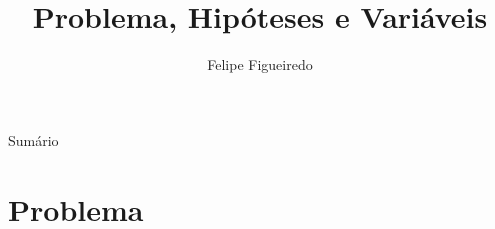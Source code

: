 \documentclass{beamer}
\title%
{Problema, Hipóteses e Variáveis}
\subtitle
{} %
\author%
{Felipe Figueiredo}%
\institute[] %
{
}
\date%
{}
\begin{document}
\begin{frame}
  \titlepage
\end{frame}

\begin{frame}{Sumário}
  \tableofcontents
\end{frame}








\section{Problema}
\end{document}
